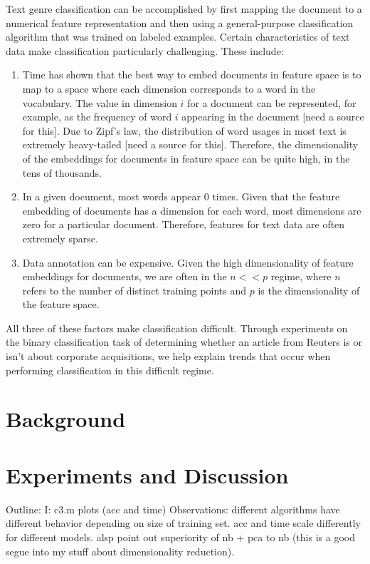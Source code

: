 \documentclass[]{article}
\begin{document}
Text genre classification can be accomplished by first mapping the document to a numerical feature representation and then using a general-purpose classification algorithm that was trained on labeled examples. Certain characteristics of text data make classification particularly challenging. These include:
\begin{enumerate}
\item Time has shown that the best way to embed documents in feature space is to map to a space where each dimension corresponds to a word in the vocabulary. The value in dimension $i$ for a document can be represented, for example, as the frequency of word $i$ appearing in the document [need a source for this]. Due to Zipf's law, the distribution of word usages in most text is extremely heavy-tailed [need a source for this]. Therefore, the dimensionality of the embeddings for documents in feature space can be quite high, in the tens of thousands. 
\item  In a given document, most words appear 0 times. Given that the feature embedding of documents has a dimension for each word, most dimensions are zero for a particular document. Therefore, features for text data are often extremely sparse. 
\item Data annotation can be expensive. Given the high dimensionality of feature embeddings for documents, we are often in the $n << p$ regime, where $n$ refers to the number of distinct training points and $p$ is the dimensionality of the feature space. 
\end{enumerate}
All three of these factors make classification difficult. Through experiments on the binary classification task of determining whether an article from Reuters is or isn't about corporate acquisitions, we help explain trends that occur when performing classification in this difficult regime. 
\section{Background}
\section{Experiments and Discussion}
Outline: 
I: c3.m plots (acc and time)
Observations: different algorithms have different behavior depending on size of training set. acc and time scale differently for different models.
alsp point out superiority of nb + pca to nb (this is a good segue into my stuff about dimensionality reduction).
\end{document}
